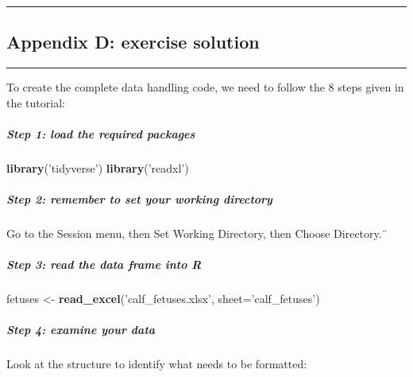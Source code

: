 \documentclass[
]{article}
\newenvironment{Shaded}{\begin{snugshade}}{\end{snugshade}}
\newcommand{\DataTypeTok}[1]{\textcolor[rgb]{0.13,0.29,0.53}{#1}}
\newcommand{\KeywordTok}[1]{\textcolor[rgb]{0.13,0.29,0.53}{\textbf{#1}}}
\newcommand{\NormalTok}[1]{#1}
\newcommand{\StringTok}[1]{\textcolor[rgb]{0.31,0.60,0.02}{#1}}
\begin{document}
\begin{center}\rule{0.5\linewidth}{0.5pt}\end{center}

\hypertarget{appendix-d-exercise-solution}{%
\subsection{Appendix D: exercise
solution}\label{appendix-d-exercise-solution}}

\begin{center}\rule{0.5\linewidth}{0.5pt}\end{center}

To create the complete data handling code, we need to follow the 8 steps
given in the tutorial:

\hypertarget{step-1-load-the-required-packages}{%
\subparagraph{Step 1: load the required
packages}\label{step-1-load-the-required-packages}}

\begin{Shaded}
\begin{Highlighting}[]
\KeywordTok{library}\NormalTok{(}\StringTok{'tidyverse'}\NormalTok{)}
\KeywordTok{library}\NormalTok{(}\StringTok{'readxl'}\NormalTok{)}
\end{Highlighting}
\end{Shaded}

\hypertarget{step-2-remember-to-set-your-working-directory}{%
\subparagraph{Step 2: remember to set your working
directory}\label{step-2-remember-to-set-your-working-directory}}

Go to the Session menu, then Set Working Directory, then Choose
Directory.¨

\hypertarget{step-3-read-the-data-frame-into-r}{%
\subparagraph{Step 3: read the data frame into
R}\label{step-3-read-the-data-frame-into-r}}

\begin{Shaded}
\begin{Highlighting}[]
\NormalTok{fetuses <-}\StringTok{ }\KeywordTok{read_excel}\NormalTok{(}\StringTok{'calf_fetuses.xlsx'}\NormalTok{, }\DataTypeTok{sheet=}\StringTok{'calf_fetuses'}\NormalTok{)}
\end{Highlighting}
\end{Shaded}

\hypertarget{step-4-examine-your-data}{%
\subparagraph{Step 4: examine your
data}\label{step-4-examine-your-data}}

Look at the structure to identify what needs to be formatted:
\end{document}
